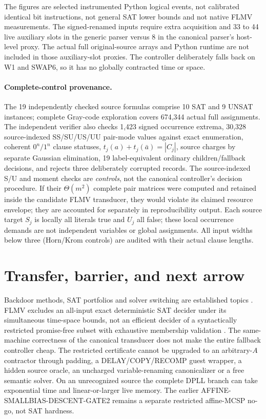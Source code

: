 \documentclass[11pt]{article}
\begin{document}
The figures are selected instrumented Python logical events, not calibrated identical bit instructions, not general SAT lower bounds and not native FLMV measurements. The signed-renamed inputs require extra acquisition and 33 to 44 live auxiliary slots in the generic parser versus 8 in the canonical parser's host-level proxy. The actual full original-source arrays and Python runtime are not included in those auxiliary-slot proxies. The controller deliberately falls back on W1 and SWAP6, so it has no globally contracted time or space.

\paragraph{Complete-control provenance.} The 19 independently checked source formulas comprise 10 SAT and 9 UNSAT instances; complete Gray-code exploration covers 674,344 actual full assignments. The independent verifier also checks 1,423 signed occurrence extrema, 30,328 source-indexed SS/SU/US/UU pair-mode values against exact enumeration, coherent $0^n/1^n$ clause statuses, $t_j(a)+t_j(\bar a)=|C_j|$, source charges by separate Gaussian elimination, 19 label-equivalent ordinary children/fallback decisions, and rejects three deliberately corrupted records. The source-indexed S/U and moment checks are \emph{controls}, not the canonical controller's decision procedure. If their $\Theta(m^2)$ complete pair matrices were computed and retained inside the candidate FLMV transducer, they would violate its claimed resource envelope; they are accounted for separately in reproducibility output. Each source target $S_j$ is locally all literals true and $U_j$ all false; these local occurrence demands are not independent variables or global assignments. All input widths below three (Horn/Krom controls) are audited with their actual clause lengths.

\section{Transfer, barrier, and next arrow}
Backdoor methods, SAT portfolios and solver switching are established topics \cite{DOS24,Xu08}. FLMV excludes an all-input exact deterministic SAT decider under its simultaneous time-space bounds, not an efficient decider of a syntactically restricted promise-free subset with exhaustive membership validation \cite{FLMV05}. The same-machine correctness of the canonical transducer does not make the entire fallback controller cheap. The restricted certificate cannot be upgraded to an arbitrary-$A$ contractor through padding, a DELAY/COPY/RECOMP guest wrapper, a hidden source oracle, an uncharged variable-renaming canonicalizer or a free semantic solver. On an unrecognized source the complete DPLL branch can take exponential time and linear-or-larger live memory. The earlier AFFINE-SMALLBIAS-DESCENT-GATE2 remains a separate restricted affine-MCSP no-go, not SAT hardness.
\end{document}
